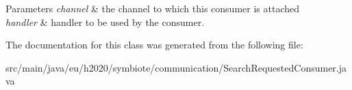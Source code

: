 \begin{DoxyParams}{Parameters}
{\em channel} & the channel to which this consumer is attached \\
\hline
{\em handler} & handler to be used by the consumer. \\
\hline
\end{DoxyParams}


The documentation for this class was generated from the following file\+:\begin{DoxyCompactItemize}
\item 
src/main/java/eu/h2020/symbiote/communication/Search\+Requested\+Consumer.\+java\end{DoxyCompactItemize}
